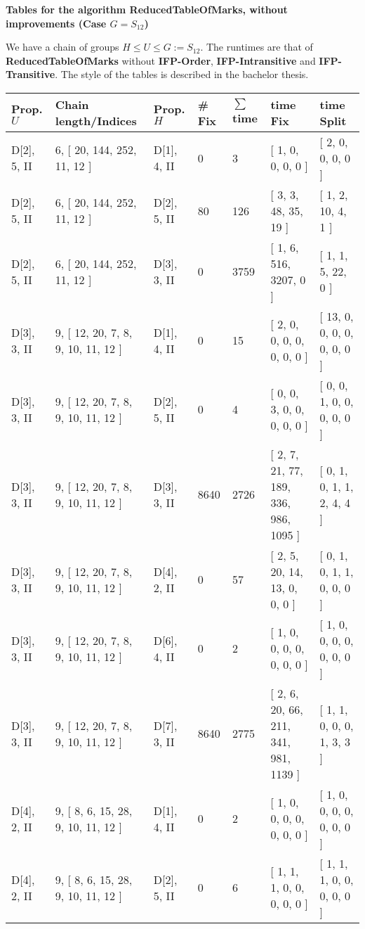 \documentclass[9 pt]{scrartcl}
\begin{document}
\begin{center}

\textbf{\LARGE Tables for the algorithm ReducedTableOfMarks, without improvements (Case $G=S_{12}$)} 

\end{center}
We have a chain of groups $H \leq U \leq G:=S_{12}$. The runtimes are that of \textbf{ReducedTableOfMarks} without \textbf{IFP-Order}, \textbf{IFP-Intransitive} and \textbf{IFP-Transitive}. The style of the tables is described in the bachelor thesis.
\begin{longtable}{ |p{3em}|p{6em}|p{3em}|p{2em}|p{2em}|p{6em}|p{6em}| }\hline 
    Prop. $U$ & Chain length/Indices & Prop. $H$ & \# Fix & $\sum$ time & time Fix& time Split   \\ \hline
D[2], 5, II &6, [ 20, 144, 252, 11, 12 ] & D[1], 4, II  & 0 & 3 & [ 1, 0, 0, 0, 0 ] & [ 2, 0, 0, 0, 0 ]\\ \hline
D[2], 5, II &6, [ 20, 144, 252, 11, 12 ] & D[2], 5, II  & 80 & 126 & [ 3, 3, 48, 35, 19 ] & [ 1, 2, 10, 4, 1 ]\\ \hline
D[2], 5, II &6, [ 20, 144, 252, 11, 12 ] & D[3], 3, II  & 0 & 3759 & [ 1, 6, 516, 3207, 0 ] & [ 1, 1, 5, 22, 0 ]\\ \hline
D[3], 3, II &9, [ 12, 20, 7, 8, 9, 10, 11, 12 ] & D[1], 4, II  & 0 & 15 & [ 2, 0, 0, 0, 0, 0, 0, 0 ] & [ 13, 0, 0, 0, 0, 0, 0, 0 ]\\ \hline
D[3], 3, II &9, [ 12, 20, 7, 8, 9, 10, 11, 12 ] & D[2], 5, II  & 0 & 4 & [ 0, 0, 3, 0, 0, 0, 0, 0 ] & [ 0, 0, 1, 0, 0, 0, 0, 0 ]\\ \hline
D[3], 3, II &9, [ 12, 20, 7, 8, 9, 10, 11, 12 ] & D[3], 3, II  & 8640 & 2726 & [ 2, 7, 21, 77, 189, 336, 986, 1095 ] & [ 0, 1, 0, 1, 1, 2, 4, 4 ]\\ \hline
D[3], 3, II &9, [ 12, 20, 7, 8, 9, 10, 11, 12 ] & D[4], 2, II  & 0 & 57 & [ 2, 5, 20, 14, 13, 0, 0, 0 ] & [ 0, 1, 0, 1, 1, 0, 0, 0 ]\\ \hline
D[3], 3, II &9, [ 12, 20, 7, 8, 9, 10, 11, 12 ] & D[6], 4, II  & 0 & 2 & [ 1, 0, 0, 0, 0, 0, 0, 0 ] & [ 1, 0, 0, 0, 0, 0, 0, 0 ]\\ \hline
D[3], 3, II &9, [ 12, 20, 7, 8, 9, 10, 11, 12 ] & D[7], 3, II  & 8640 & 2775 & [ 2, 6, 20, 66, 211, 341, 981, 1139 ] & [ 1, 1, 0, 0, 0, 1, 3, 3 ]\\ \hline
D[4], 2, II &9, [ 8, 6, 15, 28, 9, 10, 11, 12 ] & D[1], 4, II  & 0 & 2 & [ 1, 0, 0, 0, 0, 0, 0, 0 ] & [ 1, 0, 0, 0, 0, 0, 0, 0 ]\\ \hline
D[4], 2, II &9, [ 8, 6, 15, 28, 9, 10, 11, 12 ] & D[2], 5, II  & 0 & 6 & [ 1, 1, 1, 0, 0, 0, 0, 0 ] & [ 1, 1, 1, 0, 0, 0, 0, 0 ]\\ \hline

\end{longtable}
\end{document}
